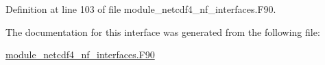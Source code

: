 Definition at line 103 of file module\+\_\+netcdf4\+\_\+nf\+\_\+interfaces.\+F90.



The documentation for this interface was generated from the following file\+:\begin{DoxyCompactItemize}
\item 
\hyperlink{module__netcdf4__nf__interfaces_8F90}{module\+\_\+netcdf4\+\_\+nf\+\_\+interfaces.\+F90}\end{DoxyCompactItemize}
